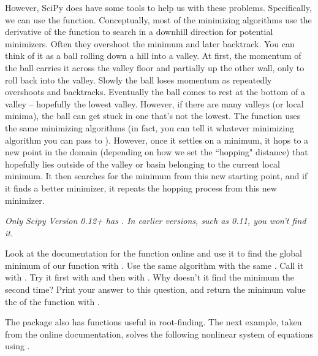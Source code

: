 However, SciPy does have some tools to help us with these problems. Specifically, we can use the  function.
Conceptually, most of the minimizing algorithms use the derivative of the function to search in a downhill direction for potential minimizers.
Often they overshoot the minimum and later backtrack. You can think of it as a ball rolling down a hill into a valley.
At first, the momentum of the ball carries it across the valley floor and partially up the other wall, only to roll back into the valley.
Slowly the ball loses momentum as repeatedly overshoots and backtracks. Eventually the ball comes to rest at the bottom of a valley -- hopefully the lowest valley.
However, if there are many valleys (or local minima), the ball can get stuck in one that's not the lowest.
The  function uses the same minimizing algorithms (in fact, you can tell it whatever minimizing algorithm you can pass to ).
However, once it settles on a minimum, it hops to a new point in the domain (depending on how we set the ``hopping" distance) that hopefully lies outside of the valley
or basin belonging to the current local minimum.
It then searches for the minimum from this new starting point, and if it finds a better minimizer, it repeats the hopping process from this new minimizer.

\emph{Only Scipy Version 0.12+ has . In earlier versions, such as 0.11, you won't find it.}
\begin{problem}

Look at the documentation for the  function online and use it to find the global minimum of our  function with .
Use the same  algorithm with the same . Call it with .
Try it first with  and then with . Why doesn't it find the minimum the second time? Print your answer to this question, and
return the minimum value the of the function with .

\end{problem}

The  package also has functions useful in root-finding.
The next example, taken from the online documentation, solves the following nonlinear system of equations using .

